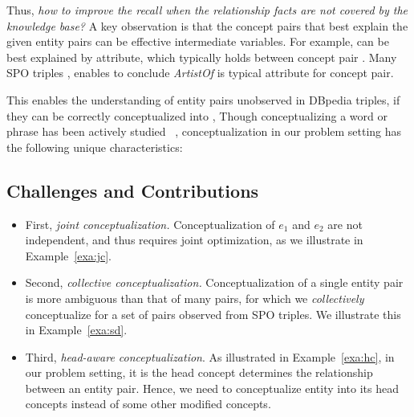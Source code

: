 Thus, {\it how to improve the recall when the relationship facts are not covered by the knowledge base?}
A key observation is that the concept pairs
that best explain the given entity pairs can be effective intermediate 
variables. 
For example,  can be best explained by  attribute, 
which typically holds between concept pair
. 
Many SPO triples
, 
enables to conclude \emph{ArtistOf} is typical attribute for
concept pair.


This enables the understanding of entity pairs unobserved in DBpedia triples,
if they can be correctly conceptualized into
,
Though conceptualizing a word or phrase
has been actively studied
~\cite{song2011short,kim2013context}, conceptualization in our problem setting has the following unique characteristics:



\subsection{Challenges and Contributions}

\begin{itemize}
\item First,  {\it joint conceptualization.} Conceptualization of
$e_1$ and $e_2$ are not independent, and thus requires joint optimization, 
as we illustrate in Example~\ref{exa:jc}.
\item Second, {\it collective conceptualization.} 
Conceptualization of a single entity pair is more ambiguous than that of many pairs, for which we \emph{collectively} conceptualize for a set of pairs observed from SPO triples.
We illustrate this in Example~\ref{exa:sd}.
\item Third, {\it head-aware conceptualization}. As illustrated in Example~\ref{exa:hc}, in our problem setting, it is the head concept determines the relationship between an entity pair. Hence, we need to conceptualize entity into its head concepts instead of some other modified concepts. 
\end{itemize}

